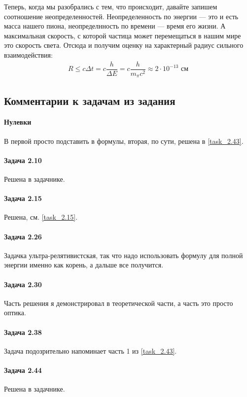 \documentclass[12pt]{article}
\begin{document}
Теперь, когда мы разобрались с тем, что происходит, давайте запишем соотношение неопределенностей. Неопределенность по энергии --- это и есть масса нашего пиона, неопределнность по времени --- время его жизни. А максимальная скорость, с которой частица может перемещаться в нашим мире это скорость света. Отсюда и получим оценку на характерный радиус сильного взаимодействия:
\begin{gather*}
    R \le c\Delta t = c\dfrac{h}{\Delta E} = c\dfrac{h}{m_{\pi}c^2}\approx 2\cdot 10^{-13} \text{ см}
\end{gather*}

\subsection{Комментарии к задачам из задания}
\paragraph{Нулевки} В первой просто подставить в формулы, вторая, по сути, решена в \ref{task_2.43}.
\paragraph{Задача 2.10} Решена в задачнике.
\paragraph{Задача 2.15} Решена, см. \ref{task_2.15}.
\paragraph{Задача 2.26} Задачка ультра-релятивистская, так что надо использовать формулу для полной энергии именно как корень, а дальше все получится.
\paragraph{Задача 2.30} Часть решения я демонстрировал в теоретической части, а часть это просто оптика.
\paragraph{Задача 2.38} Задача подозрительно напоминает часть 1 из \ref{task_2.43}.
\paragraph{Задача 2.44} Решена в задачнике.
\end{document}
